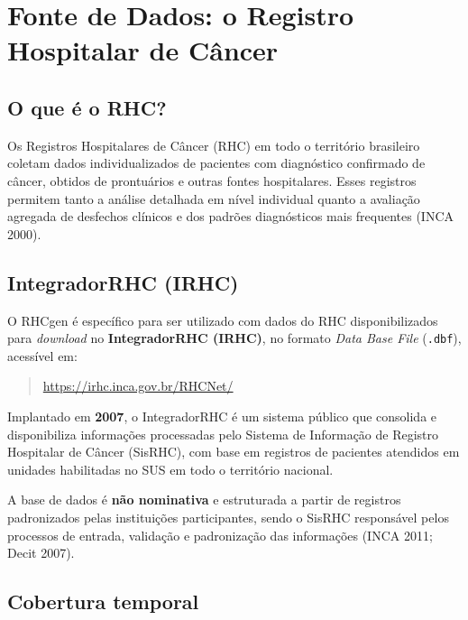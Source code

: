\documentclass[
  brazilian,
  a4paper,
  oneside]{scrbook}
\begin{document}

\chapter{Fonte de Dados: o Registro Hospitalar de
Câncer}\label{fonte-de-dados-o-registro-hospitalar-de-cuxe2ncer}

\section{O que é o RHC?}\label{o-que-uxe9-o-rhc}

Os Registros Hospitalares de Câncer (RHC) em todo o território
brasileiro coletam dados individualizados de pacientes com diagnóstico
confirmado de câncer, obtidos de prontuários e outras fontes
hospitalares. Esses registros permitem tanto a análise detalhada em
nível individual quanto a avaliação agregada de desfechos clínicos e dos
padrões diagnósticos mais frequentes (INCA 2000).

\section{IntegradorRHC (IRHC)}\label{integradorrhc-irhc}

O RHCgen é específico para ser utilizado com dados do RHC
disponibilizados para \emph{download} no \textbf{IntegradorRHC (IRHC)},
no formato \emph{Data Base File} (\texttt{.dbf}), acessível em:

\begin{quote}
\url{https://irhc.inca.gov.br/RHCNet/}
\end{quote}

Implantado em \textbf{2007}, o IntegradorRHC é um sistema público que
consolida e disponibiliza informações processadas pelo Sistema de
Informação de Registro Hospitalar de Câncer (SisRHC), com base em
registros de pacientes atendidos em unidades habilitadas no SUS em todo
o território nacional.

A base de dados é \textbf{não nominativa} e estruturada a partir de
registros padronizados pelas instituições participantes, sendo o SisRHC
responsável pelos processos de entrada, validação e padronização das
informações (INCA 2011; Decit 2007).

\section{Cobertura temporal}\label{cobertura-temporal}
\end{document}
